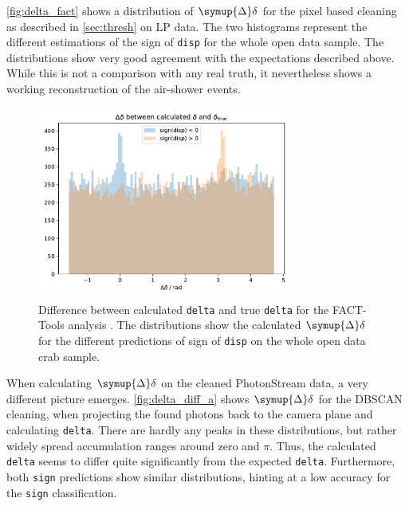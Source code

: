 \autoref{fig:delta_fact} shows a distribution of $\symup{\Delta}\delta$ for
the pixel based cleaning as described in \autoref{sec:thresh} on LP data.
The two histograms represent the different estimations of the sign of
\texttt{disp} for the whole open data sample. The distributions show very
good agreement with the expectations described above. While this is not a
comparison with any real truth, it nevertheless shows a working
reconstruction of the air-shower events.
%
\begin{figure}
  \centering
  \includegraphics[width=0.75\textwidth]{Plots/delta_delta/delta_delta_facttools.pdf}
  \caption{Difference between calculated \texttt{delta} and true \texttt{delta} for the FACT-Tools analysis \cite{openana}. The distributions show the calculated $\symup{\Delta}\delta$ for the different predictions of sign of \texttt{disp} on the whole open data crab sample.}
  \label{fig:delta_fact}
\end{figure}
%
When calculating $\symup{\Delta}\delta$ on the cleaned PhotonStream data, a
very different picture emerges. \autoref{fig:delta_diff_a} shows
$\symup{\Delta}\delta$ for the DBSCAN cleaning, when projecting the found
photons back to the camera plane and calculating \texttt{delta}. There are
hardly any peaks in these distributions, but rather widely spread
accumulation ranges around zero and $\pi$. Thus, the calculated
\texttt{delta} seems to differ quite significantly from the expected
\texttt{delta}. Furthermore, both \texttt{sign} predictions show similar
distributions, hinting at a low accuracy for the \texttt{sign}
classification.


